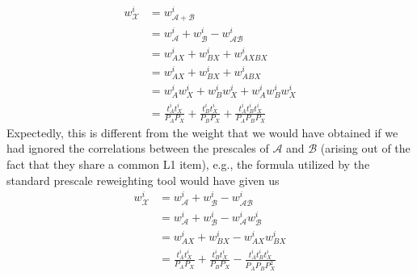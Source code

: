 \begin{align}
w^i_\mathcal{X}&=w^i_{\mathcal{A}+\mathcal{B}}\\
&=w^i_{\mathcal{A}}+w^i_{\mathcal{B}}-w^i_{\mathcal{AB}}\\
&=w^i_{AX}+w^i_{BX}+w^i_{AXBX}\\
&=w^i_{AX}+w^i_{BX}+w^i_{ABX}\\
&=w^i_A w^i_X+w^i_B w^i_X+w^i_A w^i_B w^i_X\\
&=\frac{t^i_At^i_X}{P_A P_X}+\frac{t^i_Bt^i_X}{P_B P_X}+\frac{t^i_At^i_Bt^i_X}{P_A P_B P_X}
\end{align}
Expectedly, this is different from the weight that we would have obtained if we had ignored the correlations between the prescales of $\mathcal{A}$ and $\mathcal{B}$ (arising out of the fact that they share a common L1 item), e.g., the formula utilized by the standard prescale reweighting tool \cite{Buttinger:2014726} would have given us
\begin{align}
    w^i_{\mathcal{X}}&=w^i_{\mathcal{A}}+w^i_{\mathcal{B}}-w^i_{\mathcal{AB}}\\
    &=w^i_{\mathcal{A}}+w^i_{\mathcal{B}}-w^i_{\mathcal{A}}w^i_{\mathcal{B}}\\
    &=w^i_{AX}+w^i_{BX}-w^i_{AX}w^i_{BX}\\
    &=\frac{t^i_At^i_X}{P_A P_X}+\frac{t^i_Bt^i_X}{P_B P_X}-\frac{t^i_At^i_Bt^i_X}{P_A P_B P^2_X}
\end{align}
